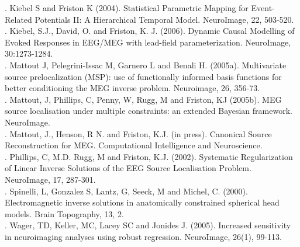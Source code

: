 . Kiebel S and Friston K (2004). Statistical Parametric Mapping for Event-Related Potentials II: A Hierarchical Temporal Model. NeuroImage, 22, 503-520.\\

. Kiebel, S.J., David, O. and Friston, K. J. (2006). Dynamic Causal Modelling of Evoked Responses in EEG/MEG with lead-field parameterization. NeuroImage, 30:1273-1284.\\

. Mattout J, Pelegrini-Issac M, Garnero L and Benali H. (2005a). Multivariate source prelocalization (MSP): use of functionally informed basis functions for better conditioning the MEG inverse problem. Neuroimage, 26, 356-73.\\

. Mattout, J, Phillips, C, Penny, W, Rugg, M and Friston, KJ (2005b). MEG source localisation under multiple constraints: an extended Bayesian framework. NeuroImage.\\

. Mattout, J., Henson, R N. and Friston, K.J. (in press). Canonical Source Reconstruction for MEG. Computational Intelligence and Neuroscience.\\

. Phillips, C, M.D. Rugg, M and Friston, K.J. (2002). Systematic Regularization of Linear Inverse Solutions of the EEG Source Localisation Problem. NeuroImage, 17, 287-301.\\

. Spinelli, L, Gonzalez S, Lantz, G, Seeck, M and Michel, C. (2000). Electromagnetic inverse solutions in anatomically constrained spherical head models. Brain Topography, 13, 2.\\

. Wager, TD, Keller, MC, Lacey SC and Jonides J. (2005). Increased sensitivity in neuroimaging analyses using robust regression. NeuroImage, 26(1), 99-113.\\
